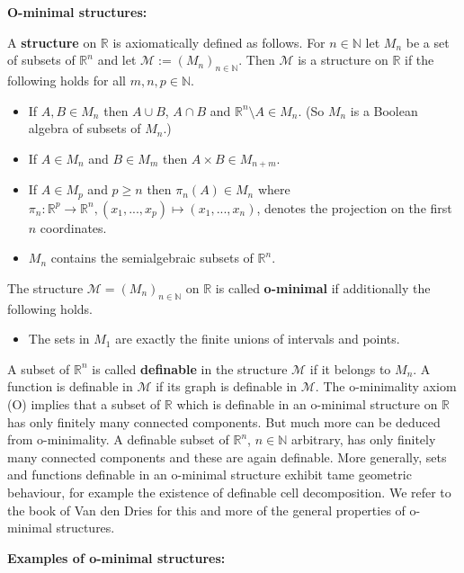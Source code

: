 \documentclass[12pt]{article}
\def\vs{\vspace}
\begin{document}
\vs{0.3cm}
{\bf O-minimal structures:}

\vs{0.1cm}
A \textbf{structure} on $\mathbb{R}$ is axiomatically defined as follows. For $n \in \mathbb{N}$ let $M_n$ be a set of subsets of $\mathbb{R}^n$ and let $\mathcal{M}:=(M_n)_{n \in \mathbb{N}}$. Then $\mathcal{M}$ is a structure on $\mathbb{R}$ if the following holds for all $m,n,p \in \mathbb{N}$.
\begin{itemize}
	\item [(S1)] If $A,B \in M_n$ then $A \cup B$, $A \cap B$ and $\mathbb{R}^n \setminus A \in M_n$. (So $M_n$ is a Boolean algebra of subsets of $M_n$.)
	\item [(S2)] If $A \in M_n$ and $B \in M_m$ then $A \times B \in M_{n+m}$.
	\item [(S3)] If $A \in M_p$ and $p \geq n$ then $\pi_n(A) \in M_n$ where $\pi_n:\mathbb{R}^p \to \mathbb{R}^n, (x_1,...,x_p) \mapsto (x_1,...,x_n)$, denotes the projection on the first $n$ coordinates.
	\item [(S4)] $M_n$ contains the semialgebraic subsets of $\mathbb{R}^n$. 
\end{itemize}
The structure $\mathcal{M}=(M_n)_{n \in \mathbb{N}}$ on $\mathbb{R}$ is called \textbf{o-minimal} if additionally the following holds.
\begin{itemize}
	\item [(O)] The sets in $M_1$ are exactly the finite unions of intervals and points.
\end{itemize}

A subset of $\mathbb{R}^n$ is called \textbf{definable} in the structure $\mathcal{M}$ if it belongs to $M_n$.
A function is definable in $\mathcal{M}$ if its graph is definable in $\mathcal{M}$.
The o-minimality axiom (O) implies that a subset of $\mathbb{R}$ which is definable in an o-minimal structure on $\mathbb{R}$ has only finitely many connected components. But much more can be deduced from o-minimality. A definable subset of $\mathbb{R}^n$, $n \in \mathbb{N}$ arbitrary, has only finitely many connected components and these are again definable. More generally, sets and functions definable in an o-minimal
structure exhibit tame geometric behaviour, for example the existence of definable
cell decomposition. We refer to the book of Van den Dries \cite{3} for this and more of the general properties of o-minimal structures.

\vs{0.5cm}
{\bf Examples of o-minimal structures:}
\end{document}

